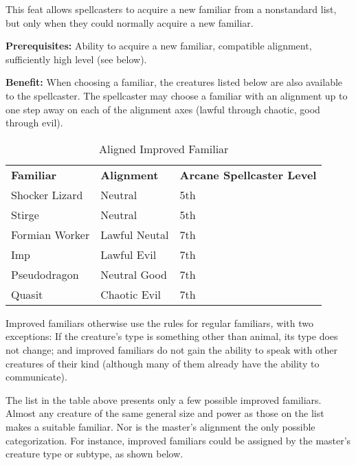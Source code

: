 
This feat allows spellcasters to acquire a new familiar from a nonstandard list, 
but only when they could normally acquire a new familiar.

\textbf{Prerequisites:} Ability to acquire a new familiar, compatible alignment, 
sufficiently high level (see below).

\textbf{Benefit:} When choosing a familiar, the creatures listed below are also 
available to the spellcaster. The spellcaster may choose a familiar with an alignment 
up to one step away on each of the alignment axes (lawful through chaotic, good 
through evil).

\begin{table}[htb]
\caption{Aligned Improved Familiar}
\centering
\begin{tabular}{l l l}
\textbf{Familiar} & \textbf{Alignment} & \textbf{Arcane Spellcaster Level}\\
Shocker Lizard & Neutral & 5th\\
Stirge & Neutral & 5th\\
Formian Worker & Lawful Neutal & 7th\\
Imp & Lawful Evil & 7th\\
Pseudodragon & Neutral Good & 7th\\
Quasit & Chaotic Evil & 7th\\
\end{tabular}
\end{table}

Improved familiars otherwise use the rules for regular familiars\textit{, }with 
two exceptions: If the creature's type is something other than animal, its type 
does not change; and improved familiars do not gain the ability to speak with other 
creatures of their kind (although many of them already have the ability to communicate).

The list in the table above presents only a few possible improved familiars. Almost 
any creature of the same general size and power as those on the list makes a suitable 
familiar. Nor is the master's alignment the only possible categorization. For instance, 
improved familiars could be assigned by the master's creature type or subtype, 
as shown below.

